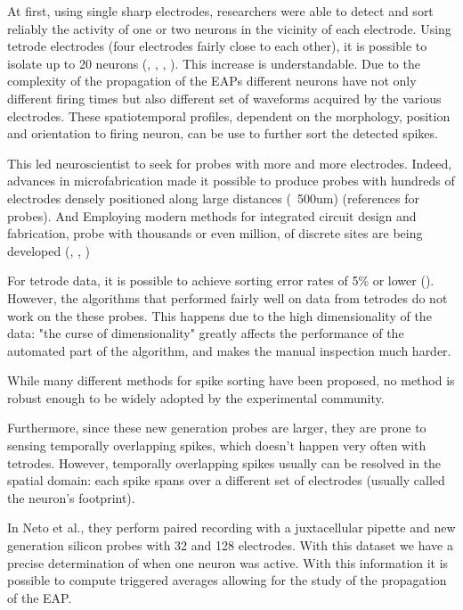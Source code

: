 At first, using single sharp electrodes, researchers were able to detect and sort reliably the activity of one or two neurons in the vicinity of each electrode. Using tetrode electrodes (four electrodes fairly close to each other), it is possible to isolate up to 20 neurons (\cite{mcnaughton1983stereotrode}, \cite{gray1995tetrodes}, \cite{wilson1993dynamics}, \cite{recce1989tetrode}). This increase is understandable. Due to the complexity of the propagation of the EAPs different neurons have not only different firing times but also different set of waveforms acquired by the various electrodes. These spatiotemporal profiles, dependent on the morphology, position and orientation to firing neuron, can be use to further sort the detected spikes.  

This led neuroscientist to seek for probes with more and more electrodes. Indeed, advances in microfabrication made it possible to produce probes with hundreds of electrodes densely positioned along large distances (~500um) (references for probes). And Employing modern methods for integrated circuit design and fabrication, probe with thousands or even million, of discrete sites are being developed (\cite{dombovari2014vivo}, \cite{ruther2015new}, \cite{shobe2015brain})

For tetrode data, it is possible to achieve sorting error rates of 5\% or lower (\cite{harris2000accuracy}). However, the algorithms that performed fairly well on data from tetrodes do not work on the these probes. This happens due to the high dimensionality of the data: "the curse of dimensionality" greatly affects the performance of the automated part of the algorithm, and makes the manual inspection much harder.

While many different methods for spike sorting have been proposed, no method is robust enough to be widely adopted by the experimental community.

Furthermore, since these new generation probes are larger, they are prone to sensing temporally overlapping spikes, which doesn't happen very often with tetrodes. However, temporally overlapping spikes usually can be resolved in the spatial domain: each spike spans over a different  set of electrodes (usually called the neuron's footprint).

In Neto et al., they perform paired recording with a juxtacellular pipette and new generation silicon probes with 32 and 128 electrodes. With this dataset we have a precise determination of when one neuron was active. With this information it is possible to compute triggered averages allowing for the study of the propagation of the EAP.

